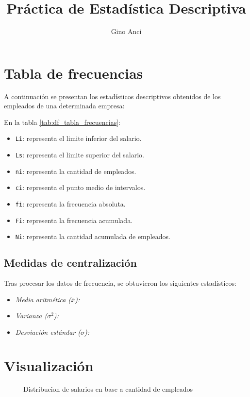 \documentclass{article}
\title{Práctica de Estadística Descriptiva}
\author{Gino Anci}
\begin{document}
\maketitle

\section{Tabla de frecuencias}
A continuación se presentan los estadísticos descriptivos obtenidos de los empleados de una determinada empresa:



En la tabla \ref{tab:df_tabla_frecuencias}:
\begin{itemize}
    \item \texttt{Li}: representa el limite inferior del salario.
    \item \texttt{Ls}: representa el limite superior del salario.
    \item \texttt{ni}: representa la cantidad de empleados.
    \item \texttt{ci}: representa el punto medio de intervalos.
    \item \texttt{fi}: representa la frecuencia absoluta.
    \item \texttt{Fi}: representa la frecuencia acumulada.
    \item \texttt{Ni}: representa la cantidad acumulada de empleados.
\end{itemize}

\subsection{Medidas de centralización}

Tras procesar los datos de frecuencia, se obtuvieron los siguientes estadísticos:


\begin{itemize}
    \item \textit{Media aritmética ($\bar{x}$):} \media
    \item \textit{Varianza ($\sigma^2$):} \varianza
    \item \textit{Desviación estándar ($\sigma$):} \desviacion
\end{itemize}

\section{Visualización}
\begin{figure}[!ht]
    \caption{Distribucion de salarios en base a cantidad de empleados}
    \label{fig:hist}
    
\end{figure}
\end{document}
